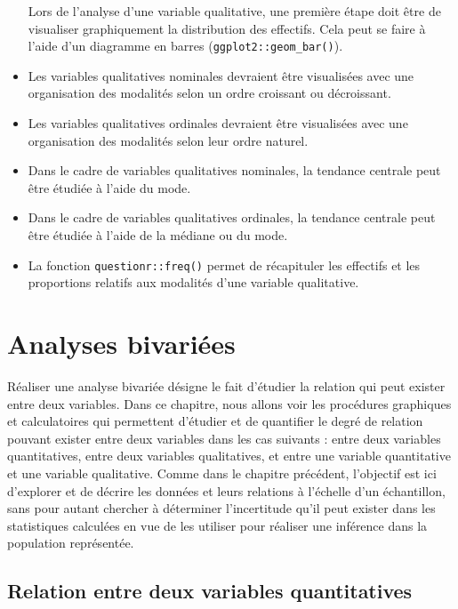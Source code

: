 \documentclass[
  french,
]{book}
\begin{document}
\begin{itemize}
  Lors de l'analyse d'une variable qualitative, une première étape doit être de visualiser graphiquement la distribution des effectifs. Cela peut se faire à l'aide d'un diagramme en barres (\texttt{ggplot2::geom\_bar()}).
\item
  Les variables qualitatives nominales devraient être visualisées avec une organisation des modalités selon un ordre croissant ou décroissant.
\item
  Les variables qualitatives ordinales devraient être visualisées avec une organisation des modalités selon leur ordre naturel.
\item
  Dans le cadre de variables qualitatives nominales, la tendance centrale peut être étudiée à l'aide du mode.
\item
  Dans le cadre de variables qualitatives ordinales, la tendance centrale peut être étudiée à l'aide de la médiane ou du mode.
\item
  La fonction \texttt{questionr::freq()} permet de récapituler les effectifs et les proportions relatifs aux modalités d'une variable qualitative.
\end{itemize}

\hypertarget{analyses-bivariuxe9es}{%
\chapter{Analyses bivariées}\label{analyses-bivariuxe9es}}

Réaliser une analyse bivariée désigne le fait d'étudier la relation qui peut exister entre deux variables. Dans ce chapitre, nous allons voir les procédures graphiques et calculatoires qui permettent d'étudier et de quantifier le degré de relation pouvant exister entre deux variables dans les cas suivants : entre deux variables quantitatives, entre deux variables qualitatives, et entre une variable quantitative et une variable qualitative. Comme dans le chapitre précédent, l'objectif est ici d'explorer et de décrire les données et leurs relations à l'échelle d'un échantillon, sans pour autant chercher à déterminer l'incertitude qu'il peut exister dans les statistiques calculées en vue de les utiliser pour réaliser une inférence dans la population représentée.

\hypertarget{relation-entre-deux-variables-quantitatives}{%
\section{Relation entre deux variables quantitatives}\label{relation-entre-deux-variables-quantitatives}}
\end{document}
